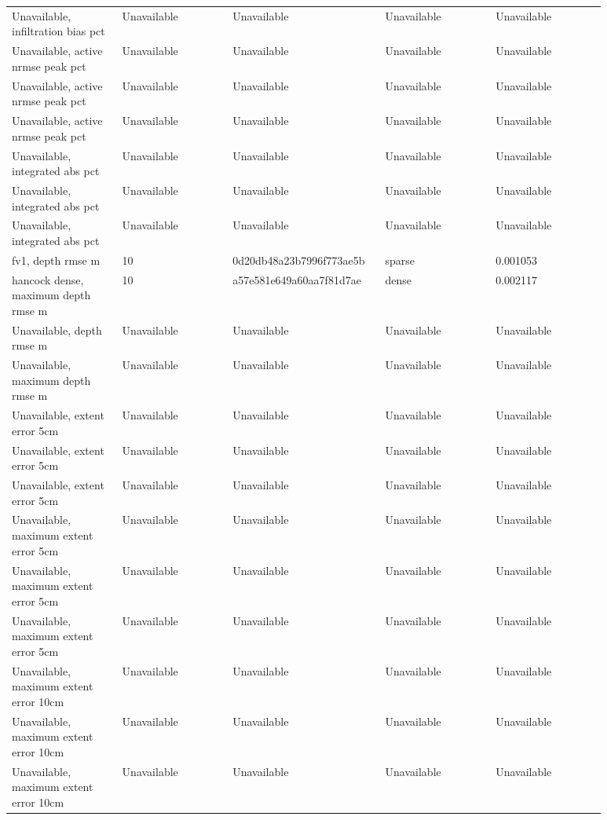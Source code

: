 \begin{longtable}{p{0.1760\linewidth}p{0.1760\linewidth}p{0.1760\linewidth}p{0.1760\linewidth}p{0.1760\linewidth}}
Unavailable, infiltration bias pct & Unavailable & Unavailable & Unavailable & Unavailable \\
Unavailable, active nrmse peak pct & Unavailable & Unavailable & Unavailable & Unavailable \\
Unavailable, active nrmse peak pct & Unavailable & Unavailable & Unavailable & Unavailable \\
Unavailable, active nrmse peak pct & Unavailable & Unavailable & Unavailable & Unavailable \\
Unavailable, integrated abs pct & Unavailable & Unavailable & Unavailable & Unavailable \\
Unavailable, integrated abs pct & Unavailable & Unavailable & Unavailable & Unavailable \\
Unavailable, integrated abs pct & Unavailable & Unavailable & Unavailable & Unavailable \\
fv1, depth rmse m & 10 & 0d20db48a23b7996f773ae5b & sparse & 0.001053 \\
hancock dense, maximum depth rmse m & 10 & a57e581e649a60aa7f81d7ae & dense & 0.002117 \\
Unavailable, depth rmse m & Unavailable & Unavailable & Unavailable & Unavailable \\
Unavailable, maximum depth rmse m & Unavailable & Unavailable & Unavailable & Unavailable \\
Unavailable, extent error 5cm & Unavailable & Unavailable & Unavailable & Unavailable \\
Unavailable, extent error 5cm & Unavailable & Unavailable & Unavailable & Unavailable \\
Unavailable, extent error 5cm & Unavailable & Unavailable & Unavailable & Unavailable \\
Unavailable, maximum extent error 5cm & Unavailable & Unavailable & Unavailable & Unavailable \\
Unavailable, maximum extent error 5cm & Unavailable & Unavailable & Unavailable & Unavailable \\
Unavailable, maximum extent error 5cm & Unavailable & Unavailable & Unavailable & Unavailable \\
Unavailable, maximum extent error 10cm & Unavailable & Unavailable & Unavailable & Unavailable \\
Unavailable, maximum extent error 10cm & Unavailable & Unavailable & Unavailable & Unavailable \\
Unavailable, maximum extent error 10cm & Unavailable & Unavailable & Unavailable & Unavailable \\

\end{longtable}
